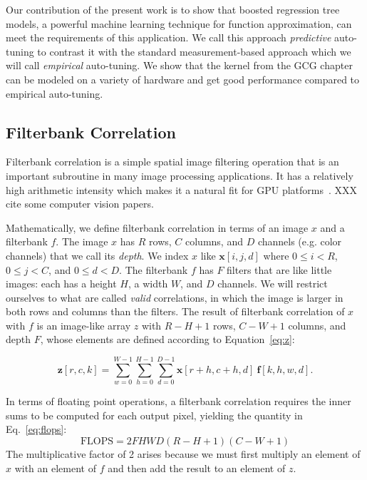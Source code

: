 \documentclass{sig-alternate}
\begin{document}
Our contribution of the present work is to show that boosted regression tree models,
a powerful machine learning technique for function approximation, can meet the
requirements of this application.
We call this approach {\em predictive} auto-tuning to contrast it with the standard measurement-based approach which we will call {\em empirical} auto-tuning.
We show that the kernel from the GCG chapter can be modeled on a variety of hardware and get good performance compared to empirical auto-tuning.


\subsection{Filterbank Correlation}
\label{sec:fbcorr}

Filterbank correlation is a simple spatial image filtering operation that is
an important subroutine in many image processing applications. It has a relatively
high arithmetic intensity which makes it a natural fit for GPU platforms~\citep{pinto+cox:2011gcg}. XXX cite some computer vision papers.

Mathematically, we define filterbank correlation in terms of an
image $x$ and a filterbank $f$.
The image $x$ has $R$ rows, $C$ columns, and $D$ channels (e.g. color
channels) that we call its {\em depth}. We index $x$ like $\mathbf{x}[i,j,d]$
where $0 \leq i < R$, $0 \leq j < C$, and $0 \leq d < D$.
The filterbank $f$ has $F$ filters that are like little images: each has a
height $H$, a width $W$, and $D$ channels.
We will restrict ourselves to what are called {\em valid} correlations, in
which the image is larger in both rows and columns than the filters.
The result of filterbank correlation of $x$ with $f$ is an image-like array
$z$ with $R-H+1$ rows, $C-W+1$ columns, and depth $F$, whose elements are
defined according to Equation~\ref{eq:z}:

\begin{equation}
    \mathbf{z}[r,c,k] = \sum_{w=0}^{W-1} \sum_{h=0}^{H-1} \sum_{d=0}^{D-1}
        \mathbf{x}[r+h, c+h, d]~ \mathbf{f}[k, h, w, d].
        \label{eq:z}
\end{equation}

In terms of floating point operations, a filterbank correlation requires the
inner sums to be computed for each output pixel, yielding the quantity in
Eq.~\ref{eq:flops}:
\begin{equation}
\mathrm{FLOPS} = 2  F  H  W  D  (R - H + 1)( C- W + 1)
\label{eq:flops}
\end{equation}
The multiplicative factor of 2 arises because we must first multiply an element of
$x$ with an element of $f$ and then add the result to an element of $z$.
\end{document}
